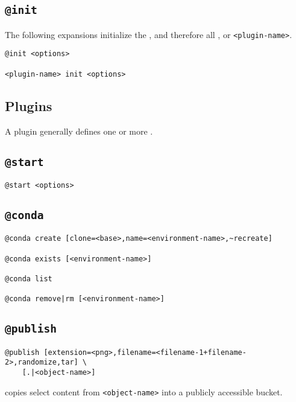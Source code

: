 \subsection{\texttt{@init}}\label{init}

The following expansions initialize the , and therefore all , or \texttt{<plugin-name>}.
%
\begin{verbatim}
@init <options>

<plugin-name> init <options>
\end{verbatim}

\subsection{Plugins}\label{plugins}

A plugin generally defines one or more .

\subsection{\texttt{@start}}\label{start}

\begin{verbatim}
@start <options>
\end{verbatim}

\subsection{\texttt{@conda}}\label{conda}

\begin{verbatim}
@conda create [clone=<base>,name=<environment-name>,~recreate]

@conda exists [<environment-name>]

@conda list

@conda remove|rm [<environment-name>]
\end{verbatim}

\subsection{\texttt{@publish}}\label{publish}

\begin{verbatim}
@publish [extension=<png>,filename=<filename-1+filename-2>,randomize,tar] \
    [.|<object-name>]
\end{verbatim}
%
copies select content from \texttt{<object-name>} into a publicly accessible bucket.



